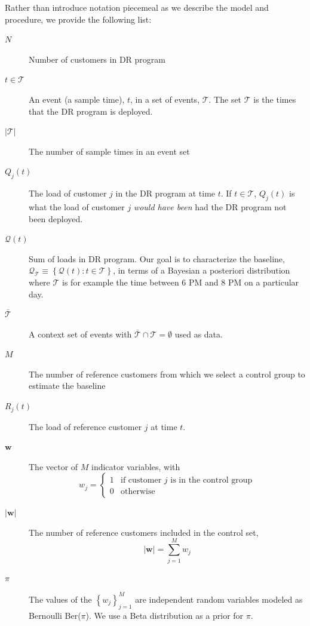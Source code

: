 \documentclass[journal]{IEEEtran}
\newcommand{\eventset}{\mathcal{T}}
\newcommand{\wvector}{\mathbf w}
\newcommand{\context}{{\bar {\mathcal{T}}}}
\newcommand{\drpower}{Q}
\newcommand{\sumdrpower}{{\mathcal{Q}}}
\newcommand{\referencepower}{R}
\begin{document}
Rather than introduce notation piecemeal as we describe the model and
procedure, we provide the following list:
\begin{description}
\item[$N$] Number of customers in DR program
\item[$t\in \eventset$] An event (a sample time), $t$, in a set of
  events, $\eventset$.  The set $\eventset$ is the times that the DR
  program is deployed.
\item[$\left| \eventset \right|$] The number of sample times in an
  event set
\item[$\drpower_j(t)$] The load of customer $j$ in the DR program at
  time $t$.  If $t\in \eventset$, $\drpower_j(t)$ is what the load of
  customer $j$ \emph{would have been} had the DR program not been
  deployed.
\item[$\sumdrpower(t)$] Sum of loads in DR program.  Our goal is to
  characterize the baseline,
  $\sumdrpower_\eventset \equiv \left\{ \sumdrpower(t) : t \in \eventset
  \right\}$, in terms of a Bayesian a posteriori distribution where
  $\eventset$ is for example the time between 6 PM and 8 PM on a
  particular day.
\item[$\context$] A context set of events with $\context \cap
  \eventset = \emptyset$ used as data.
\item[$M$] The number of reference customers from which we select a
  control group to estimate the baseline
\item[$\referencepower_j(t)$] The load of reference customer $j$ at
  time $t$.
\item[$\wvector$] The vector of $M$ indicator variables,
  with
  \begin{equation*}
    w_j =
    \begin{cases}
      1 & \text{if customer } j \text{ is in the control group}\\
      0 & \text{otherwise}
    \end{cases}
  \end{equation*}
\item[$\left| \wvector \right|$] The number of reference customers
  included in the control set,
  \begin{equation*}
    \left| \wvector \right| = \sum_{j=1}^M w_j
  \end{equation*}
\item[$\pi$] The values of the $\left\{ w_j \right\}_{j=1}^M$ are
  independent random variables modeled as Bernoulli Ber($\pi$).  We
  use a Beta distribution as a prior for $\pi$.

\end{description}
\end{document}
